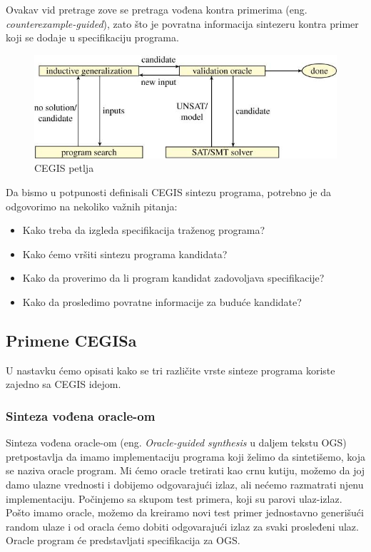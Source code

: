 Ovakav vid pretrage zove se pretraga vođena kontra primerima (eng. \emph{counterexample-guided}), zato što je povratna informacija sintezeru kontra primer koji se dodaje u specifikaciju programa. 


\begin{figure}[h!]
\begin{center}
\includegraphics[scale=0.4]{resources/cegis.jpeg}
\end{center}
\caption{CEGIS petlja \cite{AboutPS}}
\label{fig:cegis}
\end{figure}


Da bismo u potpunosti definisali CEGIS sintezu programa, potrebno je da odgovorimo na nekoliko važnih pitanja:

\begin{itemize}
  \item Kako treba da izgleda specifikacija traženog programa?
  \item Kako ćemo vršiti sintezu programa kandidata?
  \item Kako da proverimo da li program kandidat zadovoljava specifikacije?
  \item Kako da prosledimo povratne informacije za buduće kandidate?
\end{itemize}


\subsection{Primene CEGISa}
\label{subsec:primeneCEGISa}

U nastavku ćemo opisati kako se tri različite vrste sinteze programa koriste zajedno sa CEGIS idejom.

\subsubsection{Sinteza vođena oracle-om}
\label{subsec:oracleGuidedSynthesis}

Sinteza vođena oracle-om (eng. \emph{Oracle-guided synthesis} u daljem tekstu OGS) pretpostavlja da imamo implementaciju programa koji želimo da sintetišemo, koja se naziva oracle program. Mi ćemo oracle tretirati kao crnu kutiju, možemo da joj damo ulazne vrednosti i dobijemo odgovarajući izlaz, ali nećemo razmatrati njenu implementaciju.  Počinjemo sa skupom test primera, koji su parovi ulaz-izlaz. Pošto imamo oracle, možemo da kreiramo novi test primer jednostavno generišući random ulaze i od oracla ćemo dobiti odgovarajući izlaz za svaki prosleđeni ulaz. Oracle program će predstavljati specifikacija za OGS.


